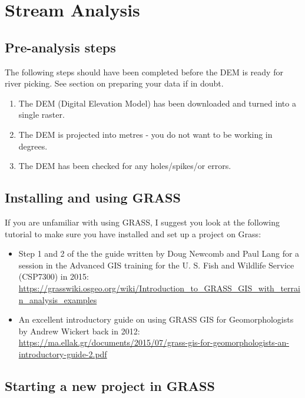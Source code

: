 \chapter{Stream Analysis} \label{stream}

\section{Pre-analysis steps}

The following steps should have been completed before the DEM is ready for river picking. See  section on preparing your data if in doubt. 

\begin{enumerate}
\item The DEM (Digital Elevation Model) has been downloaded and turned into a single raster. 
\item The DEM is projected into metres - you do not want to be working in degrees. 
\item The DEM has been checked for any holes/spikes/or errors. 
\end{enumerate}

\vspace{3mm}

\section{Installing and using GRASS}

If you are unfamiliar with using GRASS, I suggest you look at the following tutorial to make sure you have installed and set up a project on Grass:

\begin{itemize}
\item Step 1 and 2 of the the guide written by Doug Newcomb and Paul Lang for a session in the Advanced GIS training for the U. S. Fish and Wildlife Service (CSP7300) in 2015:
\url{https://grasswiki.osgeo.org/wiki/Introduction_to_GRASS_GIS_with_terrain_analysis_examples}
\item
An excellent introductory guide on using GRASS GIS for Geomorphologists by Andrew Wickert back in 2012:
\url{https://ma.ellak.gr/documents/2015/07/grass-gis-for-geomorphologists-an-introductory-guide-2.pdf}
\end{itemize}

\vspace{6mm}

\section{Starting a new project in GRASS}

